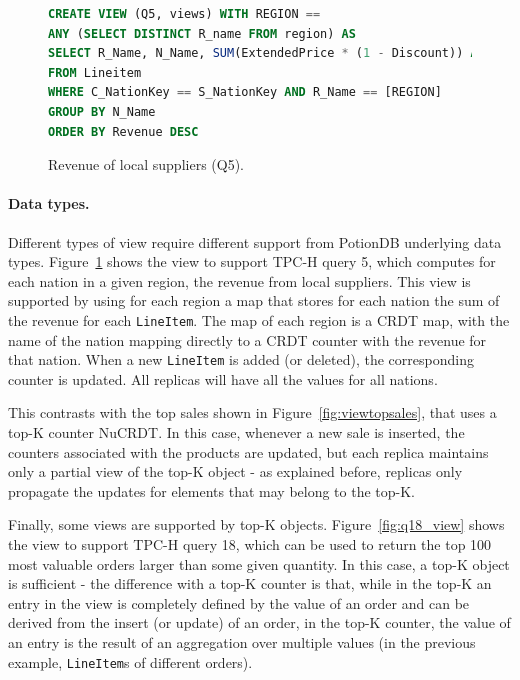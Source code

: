 \documentclass[sigplan,twocolumn,review,anonymous]{acmart}
\begin{document}
\begin{figure}[t]
\small{
\begin{lstlisting}[language=SQL]
CREATE VIEW (Q5, views) WITH REGION == 
ANY (SELECT DISTINCT R_name FROM region) AS
SELECT R_Name, N_Name, SUM(ExtendedPrice * (1 - Discount)) AS Revenue
FROM Lineitem
WHERE C_NationKey == S_NationKey AND R_Name == [REGION]
GROUP BY N_Name
ORDER BY Revenue DESC
\end{lstlisting}}
	\vspace{-5pt}
	\caption{Revenue of local suppliers (Q5).}
	\vspace{-10pt}
	\label{fig:viewlocalsupliers}
\end{figure}


\paragraph{Data types.} Different types of view require different support from PotionDB underlying data types.
Figure~\ref{fig:viewlocalsupliers} shows the view to support TPC-H query 5, which computes
for each nation in a given region, the revenue from local suppliers. 
This view is supported by using for each region a map that stores for each nation the sum of the 
revenue for each \texttt{LineItem}. The map of each region is a CRDT map, with the name of the nation mapping
directly to a CRDT counter with the revenue for that nation. When a new \texttt{LineItem} is added (or deleted), 
the corresponding counter is updated. All replicas will have all the values for all nations.

This contrasts with the top sales shown in Figure~\ref{fig:viewtopsales}, that uses a
top-K counter NuCRDT. In this case, whenever a new sale is inserted, the counters associated with the products are
updated, but each replica maintains only a partial view of the top-K object - as explained before, replicas only propagate 
the updates for elements that may belong to the top-K.

Finally, some views are supported by top-K objects. Figure~\ref{fig:q18_view} shows the view to 
support TPC-H query 18, which can be used to return the top 100 most valuable orders larger than 
some given quantity.  In this case, a top-K object is sufficient - the difference with a top-K counter is that,
while in the top-K an entry in the view is completely defined by the value of an order and can be derived 
from the insert (or update) of an order, in the top-K counter, the value of an entry is the result of an 
aggregation over multiple values (in the previous example, \texttt{LineItem}s of different orders).
\end{document}
